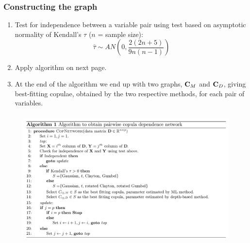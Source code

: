 \documentclass[handout,10pt]{beamer}
\begin{document}
\begin{frame}
\frametitle{Constructing the graph}
\begin{enumerate}
\item Test for independence between a variable pair using test based on asymptotic normality of Kendall's $\tau$ ($n$ = sample size):
$$ \hat\tau \sim AN\left(0,\frac{2(2n+5)}{9n(n-1)}\right) $$
\item Apply algorithm on next page.
\vspace{.2cm}
\item At the end of the algorithm we end up with two graphs, ${\mathbf{C}}_M$ and ${\mathbf{C}}_D$, giving best-fitting copulae, obtained by the two respective methods, for each pair of variables.
\end{enumerate}
\end{frame}

\begin{frame}
\begin{figure}[t]
	\centering
		\includegraphics[height=7cm]{algopic.png}
	\label{fig:fig2}
\end{figure}
\end{frame}
\end{document}
